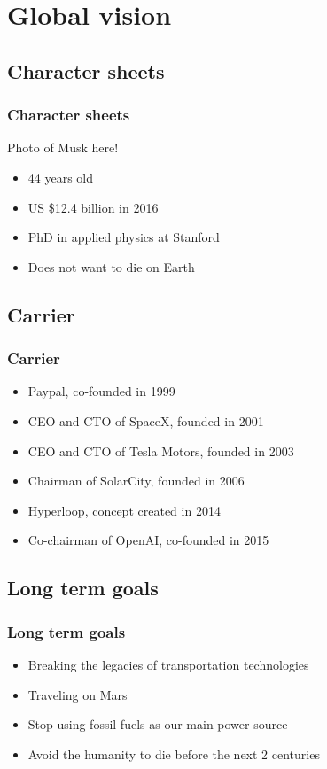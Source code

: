     \section{Global vision}

\subsection{Character sheets}
\begin{frame}
\frametitle{Character sheets}
Photo of Musk here!
\begin{itemize}
    \itemsep1em
    \item 44 years old
    \item US \${}12.4 billion in 2016
    \item PhD in applied physics at Stanford
    \item Does not want to die on Earth
\end{itemize}
\end{frame}


\subsection{Carrier}
\begin{frame}
\frametitle{Carrier}
\begin{itemize}
    \itemsep1em
    \item Paypal, co-founded in 1999 %
    \item CEO and CTO of SpaceX, founded in 2001
    \item CEO and CTO of Tesla Motors, founded in 2003
    \item Chairman of SolarCity, founded in 2006
    \item Hyperloop, concept created in 2014
    \item Co-chairman of OpenAI, co-founded in 2015
\end{itemize}
\end{frame}


\subsection{Long term goals}
\begin{frame}
\frametitle{Long term goals}
\begin{itemize}
    \itemsep1em
    \item Breaking the legacies of transportation technologies
    \item Traveling on Mars
    \item Stop using fossil fuels as our main power source
    \item Avoid the humanity to die before the next 2 centuries
\end{itemize}
\end{frame}


